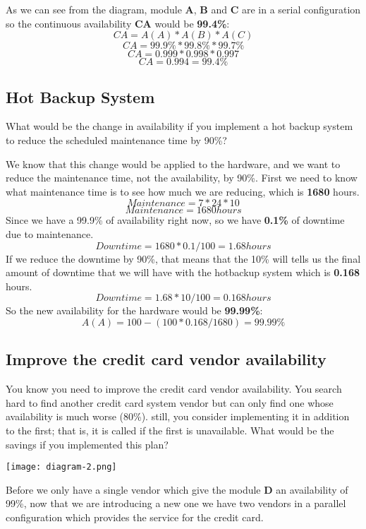 \noindent
As we can see from the diagram, module \textbf{A}, \textbf{B} and 
\textbf{C} are in a serial configuration so the continuous availability 
\textbf{CA} would be \textbf{99.4\%}:
\[ CA = A(A) * A(B) * A(C) \]
\[ CA =  99.9\% * 99.8\% * 99.7\%\]
\[ CA =  0.999 * 0.998 * 0.997\]
\[CA = 0.994 = 99.4\%\]

\pagebreak

\subsection{Hot Backup System}
What would be the change in availability if you implement a hot backup system 
to reduce the scheduled maintenance time by 90\%? \newline

\noindent
We know that this change would be applied to the hardware, and we want to reduce 
the maintenance time, not the availability, by 90\%. First we need to know 
what maintenance time is to see how much we are reducing, which 
is \textbf{1680} hours.
\[ Maintenance = 7 * 24 * 10 \]
\[ Maintenance = 1680 hours \]
Since we have a 99.9\% of availability right now, so we have \textbf{0.1\%} of
downtime due to maintenance. 
\[ Downtime = 1680 * 0.1 / 100 = 1.68 hours \]
If we reduce the downtime by 90\%, that means that the 10\% will tells us the 
final amount of downtime that we will have with the hotbackup system which is 
\textbf{0.168} hours.
\[ Downtime = 1.68 * 10 / 100 = 0.168 hours \]
So the new availability for the hardware would be \textbf{99.99\%}: 
\[ A(A) = 100 - (100 * 0.168 / 1680) = 99.99\% \]

\pagebreak

\subsection{Improve the credit card vendor availability}
You know you need to improve the credit card vendor availability.  You search 
hard to find another credit card system vendor but can only find one whose 
availability is much worse (80\%).  still, you consider implementing it in 
addition to the first; that is, it is called if the first is unavailable.  
What would be the savings if you implemented this plan?

\begin{center}
    \texttt{[image: diagram-2.png]}    
\end{center}

\noindent 
Before we only have a single vendor which give the module \textbf{D} an 
availability of 99\%, now that we are introducing a new one we have two 
vendors in a parallel configuration which provides the service for the credit 
card.

